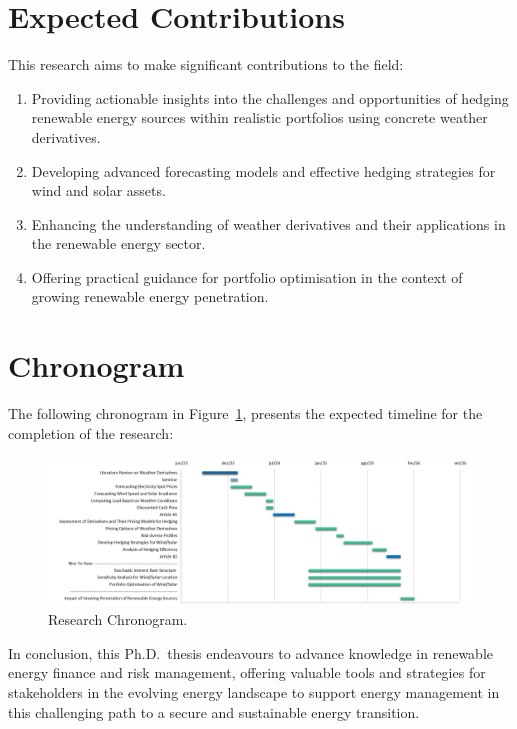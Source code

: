 \section{Expected Contributions}
    \label{sec:rs_expected-contributions}

    This research aims to make significant contributions to the field:

    \begin{enumerate}%
        \item Providing actionable insights into the challenges and opportunities of hedging renewable
            energy sources within realistic portfolios using concrete weather derivatives.
        \item Developing advanced forecasting models and effective hedging strategies for wind and solar assets.
        \item Enhancing the understanding of weather derivatives and their applications in the renewable energy sector.
        \item Offering practical guidance for portfolio optimisation in the context of growing
             renewable energy penetration.
    \end{enumerate}


\section{Chronogram}
\label{sec:rs_chronogram}

    The following chronogram in Figure~\ref{fig:chronogram}, presents the expected timeline for the completion
    of the research:

    \begin{figure}[htbp]
        \centering
        \includegraphics[width=1\textwidth]{Images/CAT/chronogram.png}
        \caption{Research Chronogram.}
        \label{fig:chronogram}
    \end{figure}
%


In conclusion, this Ph.D.\ thesis endeavours to advance knowledge in renewable energy finance and risk management,
offering valuable tools and strategies for stakeholders in the evolving energy landscape
to support energy management in this challenging path to a secure and sustainable energy transition.




